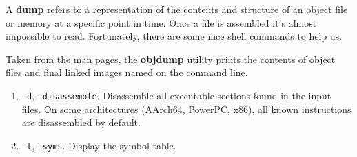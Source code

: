   A \textbf{dump} refers to a representation of the contents and structure of an object file or memory at a specific point in time. Once a file is assembled it's almost impossible to read. Fortunately, there are some nice shell commands to help us. 

  \begin{definition}
    \label{def:objdump}
    Taken from the man pages, the \textbf{objdump} utility prints the contents of object files and final linked images named on the command line. 
    \begin{enumerate}
      \item \texttt{-d}, \texttt{--disassemble}. Disassemble all executable sections found in the input files. On some architectures (AArch64, PowerPC, x86), all known instructions are disassembled by default. 
      \item \texttt{-t}, \texttt{--syms}. Display the symbol table. 
    \end{enumerate}
  \end{definition}

